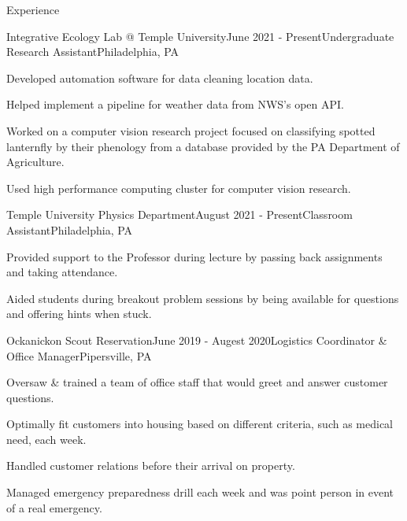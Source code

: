 \documentclass{resume} %
\begin{document}
\begin{rSection}{Experience}

\begin{rSubsection}{Integrative Ecology Lab @ Temple University}{June 2021 - Present}{Undergraduate Research Assistant}{Philadelphia, PA}
\item Developed automation software for data cleaning location data.
\item Helped implement a pipeline for weather data from NWS's open API.
\item Worked on a computer vision research project focused on classifying spotted lanternfly by their phenology from a database provided by the PA Department of Agriculture.
\item Used high performance computing cluster for computer vision research.
\end{rSubsection}


\begin{rSubsection}{Temple University Physics Department}{August 2021 - Present}{Classroom Assistant}{Philadelphia, PA}
\item Provided support to the Professor during lecture by passing back assignments and taking attendance.
\item Aided students during breakout problem sessions by being available for questions and offering hints when stuck.
\end{rSubsection}


\begin{rSubsection}{Ockanickon Scout Reservation}{June 2019 - Augest 2020}{Logistics Coordinator \& Office Manager}{Pipersville, PA}
\item Oversaw \& trained a team of office staff that would greet and answer customer questions.
\item Optimally fit customers into housing based on different criteria, such as medical need, each week.
\item Handled customer relations before their arrival on property.
\item Managed emergency preparedness drill each week and was point person in event of a real emergency.
\end{rSubsection}

\end{rSection}

\end{document}
